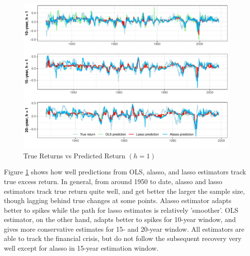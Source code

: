\documentclass[12pt,a4paper]{article}
\begin{document}
\begin{figure}
\begin{center}
		\caption{True Returns vs Predicted Return $(h = 1)$}
		\label{fig:2} 
		\includegraphics[scale = 0.695]{prediction_graph.pdf}
\end{center}
\end{figure}

Figure \ref{fig:2} shows how well predictions from OLS, alasso, and lasso estimators track true excess return. In general, from around 1950 to date, alasso and lasso estimators track true return quite well, and get better the larger the sample size, though lagging behind true changes at some points. Alasso estimator adapts better to spikes while the path for lasso estimates is relatively 'smoother'. OLS estimator, on the other hand, adapts better to spikes for 10-year window, and gives more conservative estimates for 15- and 20-year window. All estimators are able to track the financial crisis, but do not follow the subsequent recovery very well except for alasso in 15-year estimation window. 
\end{document}
